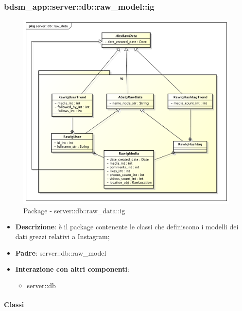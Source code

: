 		\subsubsection{bdsm\_app::server::db::raw\_model::ig} %
		\label{ssub:bdsm_app_server_db_raw_model_ig}
		\begin{figure}[htbp]
			\centering
			\centerline{\includegraphics[scale=0.5]{./images/server/raw_data_ig.pdf}}
			\caption{Package - server::db::raw\_data::ig}
		\end{figure}

		\begin{itemize}
		  \item \textbf{Descrizione}: è il package contenente le classi che definiscono i modelli dei dati grezzi relativi a Instagram;
		  \item \textbf{Padre}: server::db::raw\_model
		  \item \textbf{Interazione con altri componenti}:
		  	\begin{itemize}
		  		\item server::db
				\end{itemize}
		\end{itemize}

		\paragraph{Classi} %



